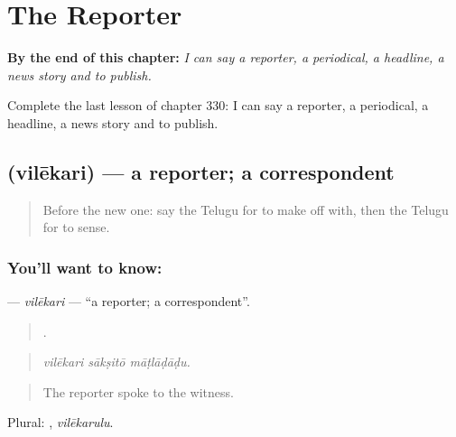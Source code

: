 
\chapter{The Reporter}
\label{ch:te-the-reporter}

\begin{chapteropening}
\textbf{By the end of this chapter:} \emph{I can say a reporter, a periodical, a headline, a news story and to publish.}

Complete the last lesson of chapter 330: I can say a reporter, a periodical, a headline, a news story and to publish.
\end{chapteropening}

\section[\texorpdfstring{\te{విలేకరి} (vilēkari)}{విలేకరి (vilēkari)}]{ (vilēkari) — a reporter; a correspondent}

\label{lesson:TE-C330-vilekari}



\begin{quote}
Before the new one: say the Telugu for to make off with, then the Telugu for to sense.
\end{quote}

\subsection*{You'll want to know: }
\textbf{} — \emph{vilēkari} — \textquotedblleft{}a reporter; a correspondent\textquotedblright{}.

\begin{quote}
  .
\end{quote}

\begin{quote}
\emph{vilēkari sākṣitō māṭlāḍāḍu.}
\end{quote}

\begin{quote}
The reporter spoke to the witness.
\end{quote}

Plural: , \emph{vilēkarulu}.

